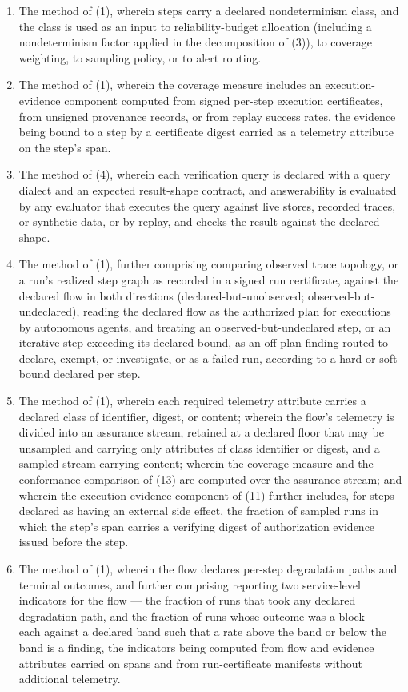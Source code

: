 \documentclass[11pt]{article}
\begin{document}
\begin{enumerate}[label=\arabic*.]
\item The method of (1), wherein steps carry a declared nondeterminism class, and the class is used as an input to reliability-budget allocation (including a nondeterminism factor applied in the decomposition of (3)), to coverage weighting, to sampling policy, or to alert routing.
\item The method of (1), wherein the coverage measure includes an execution-evidence component computed from signed per-step execution certificates, from unsigned provenance records, or from replay success rates, the evidence being bound to a step by a certificate digest carried as a telemetry attribute on the step's span.
\item The method of (4), wherein each verification query is declared with a query dialect and an expected result-shape contract, and answerability is evaluated by any evaluator that executes the query against live stores, recorded traces, or synthetic data, or by replay, and checks the result against the declared shape.
\item The method of (1), further comprising comparing observed trace topology, or a run's realized step graph as recorded in a signed run certificate, against the declared flow in both directions (declared-but-unobserved; observed-but-undeclared), reading the declared flow as the authorized plan for executions by autonomous agents, and treating an observed-but-undeclared step, or an iterative step exceeding its declared bound, as an off-plan finding routed to declare, exempt, or investigate, or as a failed run, according to a hard or soft bound declared per step.
\item The method of (1), wherein each required telemetry attribute carries a declared class of identifier, digest, or content; wherein the flow's telemetry is divided into an assurance stream, retained at a declared floor that may be unsampled and carrying only attributes of class identifier or digest, and a sampled stream carrying content; wherein the coverage measure and the conformance comparison of (13) are computed over the assurance stream; and wherein the execution-evidence component of (11) further includes, for steps declared as having an external side effect, the fraction of sampled runs in which the step's span carries a verifying digest of authorization evidence issued before the step.
\item The method of (1), wherein the flow declares per-step degradation paths and terminal outcomes, and further comprising reporting two service-level indicators for the flow --- the fraction of runs that took any declared degradation path, and the fraction of runs whose outcome was a block --- each against a declared band such that a rate above the band or below the band is a finding, the indicators being computed from flow and evidence attributes carried on spans and from run-certificate manifests without additional telemetry.

\end{enumerate}
\end{document}
